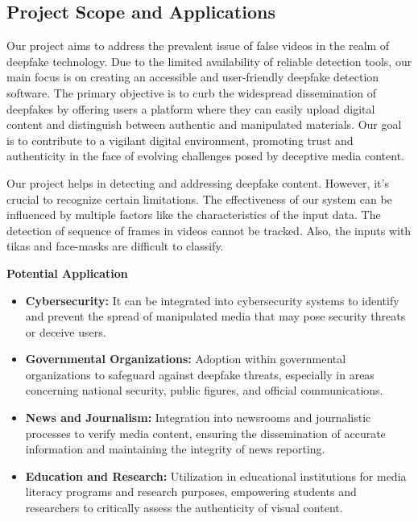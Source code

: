 \subsection{Project Scope and Applications}

Our project aims to address the prevalent issue of false videos in the realm of deepfake technology. Due to the limited availability of reliable detection tools, our main focus is on creating an accessible and user-friendly deepfake detection software. The primary objective is to curb the widespread dissemination of deepfakes by offering users a platform where they can easily upload digital content and distinguish between authentic and manipulated materials. Our goal is to contribute to a vigilant digital environment, promoting trust and authenticity in the face of evolving challenges posed by deceptive media content.

\noindent Our project helps in detecting and addressing deepfake content. However, it's crucial to recognize certain limitations. The effectiveness of our system  can be influenced by multiple factors like the characteristics of the input data. The detection of sequence of frames in videos cannot be tracked. Also, the inputs with tikas and face-masks are difficult to classify.

\noindent \textbf{Potential Application}

\begin{itemize}
    \item \textbf{Cybersecurity:} It can be integrated into cybersecurity systems to identify and prevent the spread of manipulated media that may pose security threats or deceive users.

    \item \textbf{Governmental Organizations:} Adoption within governmental organizations to safeguard against deepfake threats, especially in areas concerning national security, public figures, and official communications.

    \item \textbf{News and Journalism:} Integration into newsrooms and journalistic processes to verify media content, ensuring the dissemination of accurate information and maintaining the integrity of news reporting.

    \item \textbf{Education and Research:} Utilization in educational institutions for media literacy programs and research purposes, empowering students and researchers to critically assess the authenticity of visual content.
\end{itemize}